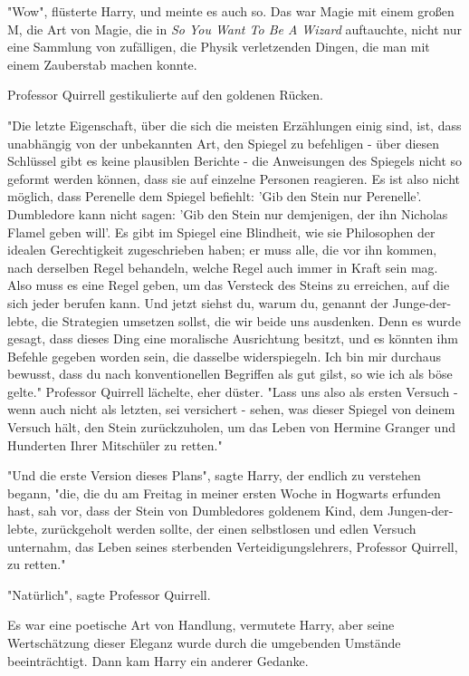 {"Wow", flüsterte Harry, und meinte es auch so. Das war Magie mit einem großen M, die Art von Magie, die in \emph{So You Want To Be A Wizard} auftauchte, nicht nur eine Sammlung von zufälligen, die Physik verletzenden Dingen, die man mit einem Zauberstab machen konnte.

Professor Quirrell gestikulierte auf den goldenen Rücken.

"Die letzte Eigenschaft, über die sich die meisten Erzählungen einig sind, ist, dass unabhängig von der unbekannten Art, den Spiegel zu befehligen - über diesen Schlüssel gibt es keine plausiblen Berichte - die Anweisungen des Spiegels nicht so geformt werden können, dass sie auf einzelne Personen reagieren. Es ist also nicht möglich, dass Perenelle dem Spiegel befiehlt: 'Gib den Stein nur Perenelle'. Dumbledore kann nicht sagen: 'Gib den Stein nur demjenigen, der ihn Nicholas Flamel geben will'. Es gibt im Spiegel eine Blindheit, wie sie Philosophen der idealen Gerechtigkeit zugeschrieben haben; er muss alle, die vor ihn kommen, nach derselben Regel behandeln, welche Regel auch immer in Kraft sein mag. Also muss es eine Regel geben, um das Versteck des Steins zu erreichen, auf die sich jeder berufen kann. Und jetzt siehst du, warum du, genannt der Junge-der-lebte, die Strategien umsetzen sollst, die wir beide uns ausdenken. Denn es wurde gesagt, dass dieses Ding eine moralische Ausrichtung besitzt, und es könnten ihm Befehle gegeben worden sein, die dasselbe widerspiegeln. Ich bin mir durchaus bewusst, dass du nach konventionellen Begriffen als gut gilst, so wie ich als böse gelte." Professor Quirrell lächelte, eher düster. "Lass uns also als ersten Versuch - wenn auch nicht als letzten, sei versichert - sehen, was dieser Spiegel von deinem Versuch hält, den Stein zurückzuholen, um das Leben von Hermine Granger und Hunderten Ihrer Mitschüler zu retten."

"Und die erste Version dieses Plans", sagte Harry, der endlich zu verstehen begann, "die, die du am Freitag in meiner ersten Woche in Hogwarts erfunden hast, sah vor, dass der Stein von Dumbledores goldenem Kind, dem Jungen-der-lebte, zurückgeholt werden sollte, der einen selbstlosen und edlen Versuch unternahm, das Leben seines sterbenden Verteidigungslehrers, Professor Quirrell, zu retten."

"Natürlich", sagte Professor Quirrell.

Es war eine poetische Art von Handlung, vermutete Harry, aber seine Wertschätzung dieser Eleganz wurde durch die umgebenden Umstände beeinträchtigt. Dann kam Harry ein anderer Gedanke.

}
